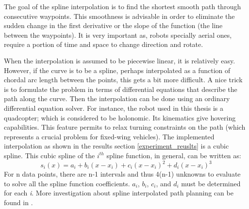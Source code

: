 




 The goal of the spline interpolation is to find the shortest smooth path through consecutive waypoints. This smoothness is advisable in order to eliminate the sudden change in the first derivative or the slope of the function (the line between the waypoints). It is very important as, robots specially aerial ones, require a portion of time and space to change direction and rotate. 
 



When the interpolation is assumed to be piecewise linear, it is relatively easy. However, if the curve is to be a spline, perhaps interpolated as a function of chordal arc length between the points, this gets a bit more difficult. A nice trick is to formulate the problem in terms of differential equations that describe the path along the curve. Then the interpolation can be done using an ordinary differential equation solver. For instance, the robot used in this thesis is a quadcopter; which is considered to be holonomic. Its kinematics give hovering capabilities. This feature permits to relax turning constraints on the path (which represents a crucial problem for fixed-wing vehicles).
The implemented interpolation as shown in the results section \ref{experiment_reuslts} is a cubic spline. This cubic spline of the $i^{th}$ spline function, in general, can be written as:
\begin{equation}
s_{i}(x)=a_{i}+b_{i}(x-x_{i})+c_{i}(x-x_{i})^2+d_{i}(x-x_{i})^3
\end{equation}
For n data points, there are n-1 intervals and thus 4(n-1) unknowns to evaluate to solve all the spline function coefficients. $a_{i}$, $b_{i}$, $c_{i}$, and $d_{i}$ must be determined for each \textit{i}. More investigation about spline interpolated path planning can be found in \cite{judd2001spline}.

